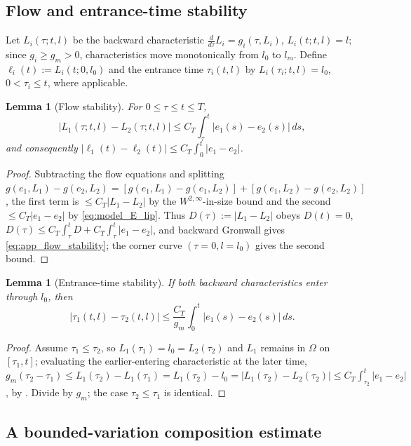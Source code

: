 \documentclass[a4paper,fleqn,longmktitle]{cas-sc}
\theoremstyle{plain}
\newtheorem{lemma}[theorem]{Lemma}
\theoremstyle{definition}
\theoremstyle{remark}
\numberwithin{equation}{section}
\begin{document}
\subsection{Flow and entrance-time stability}
Let \(L_i(\tau;t,l)\) be the backward characteristic
\(\frac{d}{d\tau}L_i=g_i(\tau,L_i)\), \(L_i(t;t,l)=l\); since \(g_i\ge g_m>0\),
characteristics move monotonically from \(l_0\) to \(l_m\). Define
\(\ell_i(t):=L_i(t;0,l_0)\) and the entrance time \(\tau_i(t,l)\) by
\(L_i(\tau_i;t,l)=l_0\), \(0<\tau_i\le t\), where applicable.
\begin{lemma}[Flow stability]
\label{lem:app_flow_stability}
For \(0\le\tau\le t\le T\),
\begin{equation}
    \label{eq:app_flow_stability}
    |L_1(\tau;t,l)-L_2(\tau;t,l)|
    \le
    C_T\int_\tau^t |e_1(s)-e_2(s)|\,ds,
\end{equation}
and consequently
\(|\ell_1(t)-\ell_2(t)|\le C_T\int_0^t|e_1-e_2|\).
\end{lemma}
\begin{proof}
Subtracting the flow equations and splitting
\(g(e_1,L_1)-g(e_2,L_2)=[g(e_1,L_1)-g(e_1,L_2)]+[g(e_1,L_2)-g(e_2,L_2)]\), the
first term is \(\le C_T|L_1-L_2|\) by the \(W^{2,\infty}\)-in-size bound and the
second \(\le C_T|e_1-e_2|\) by \eqref{eq:model_E_lip}. Thus
\(D(\tau):=|L_1-L_2|\) obeys \(D(t)=0\),
\(D(\tau)\le C_T\int_\tau^t D+C_T\int_\tau^t|e_1-e_2|\), and backward Gronwall
gives \eqref{eq:app_flow_stability}; the corner curve
\((\tau=0,l=l_0)\) gives the second bound.
\end{proof}
\begin{lemma}[Entrance-time stability]
\label{lem:app_entrance_stability}
If both backward characteristics enter through \(l_0\), then
\[
    |\tau_1(t,l)-\tau_2(t,l)|
    \le
    \frac{C_T}{g_m}\int_0^t |e_1(s)-e_2(s)|\,ds .
\]
\end{lemma}
\begin{proof}
Assume \(\tau_1\le\tau_2\), so \(L_1(\tau_1)=l_0=L_2(\tau_2)\) and \(L_1\)
remains in \(\Omega\) on \([\tau_1,t]\); evaluating the earlier-entering
characteristic at the later time, \(g_m(\tau_2-\tau_1)\le
L_1(\tau_2)-L_1(\tau_1)=L_1(\tau_2)-l_0=|L_1(\tau_2)-L_2(\tau_2)|\le
C_T\int_{\tau_2}^t|e_1-e_2|\), by . Divide by
\(g_m\); the case \(\tau_2\le\tau_1\) is identical.
\end{proof}

\subsection{A bounded-variation composition estimate}
\end{document}
